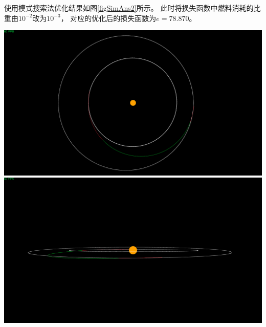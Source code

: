 使用模式搜索法优化结果如图\ref{figSimAns2}所示。
此时将损失函数中燃料消耗的比重由$10^{-2}$改为$10^{-3}$，
对应的优化后的损失函数为$e=78.870$。
\begin{center}
	\includegraphics[scale=0.2]{simans3.png}  \\
	\includegraphics[scale=0.2]{simans4.png}  \\
	\label{figSimAns2}
\end{center}


